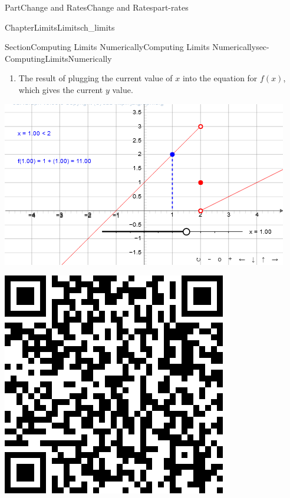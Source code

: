 \documentclass{tufte-book}
\numberwithin{equation}{chapter}
\begin{document}
\begin{partptx}{Part}{Change and Rates}{}{Change and Rates}{}{}{part-rates}
\begin{chapterptx}{Chapter}{Limits}{}{Limits}{}{}{ch_limits}
\begin{sectionptx}{Section}{Computing Limits Numerically}{}{Computing Limits Numerically}{}{}{sec-ComputingLimitsNumerically}
\begin{enumerate}
\item{}The result of plugging the current value of \(x\) into the equation for \(f(x)\), which gives the current \(y\) value.%
\end{enumerate}
%
\begin{sidebyside}{2}{0.075}{0.075}{0.17}%
\begin{sbspanel}{0.47}%
\includegraphics[width=\linewidth]{external/jsxgraph-limitnumerically.png}
\end{sbspanel}%
\begin{sbspanel}{0.21}%
\includegraphics[width=\linewidth]{generated/qrcode/sec-ComputingLimitsNumerically-4.png}

\end{sbspanel}
\end{sidebyside}
\end{sectionptx}
\end{chapterptx}
\end{partptx}
\end{document}
